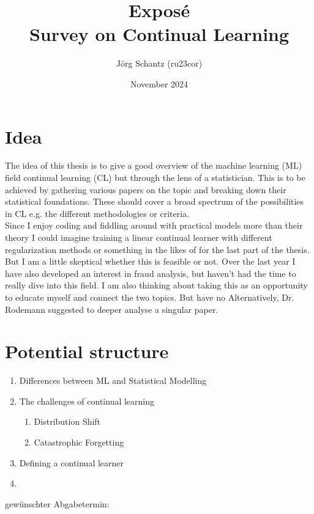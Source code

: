 \documentclass[12pt, a4paper]{report}
\title{Exposé\\
	\Large{Survey on Continual Learning}}
\author{Jörg Schantz (ru23cor)}
\date{November 2024}
\begin{document}
	\maketitle
	\renewcommand{\labelenumii}{\arabic{enumi}.\arabic{enumii}}
	\renewcommand{\labelenumiii}{\arabic{enumi}.\arabic{enumii}.\arabic{enumiii}}
	\renewcommand{\labelenumiv}{\arabic{enumi}.\arabic{enumii}.arabic{enumiii}.\arabic{enumiv}}
\section*{Idea}
	The idea of this thesis is to give a good overview of the machine learning (ML) field continual learning (CL) but through the lens of a statistician. This is to be achieved by gathering various papers on the topic and breaking down their statistical foundations. These should cover a broad spectrum of the possibilities in CL e.g. the different methodologies or criteria.\\
	Since I enjoy coding and fiddling around with practical models more than their theory I could imagine training a linear continual learner with different regularization methods or something in the likes of for the last part of the thesis. But I am a little skeptical whether this is feasible or not. Over the last year I have also developed an interest in fraud analysis, but haven't had the time to really dive into this field. I am also thinking about taking this as an opportunity to educate myself and connect the two topics. But have no  Alternatively, Dr. Rodemann suggested to deeper analyse a singular paper.\\
\section*{Potential structure}
	\begin{enumerate}
		\item Differences between ML and Statistical Modelling
		\item The challenges of continual learning 
		\begin{enumerate}
			\item Distribution Shift
			\item Catastrophic Forgetting
		\end{enumerate}
		\item Defining a continual learner
		\item 
	\end{enumerate}
	gewünschter Abgabetermin:\\
\end{document}
